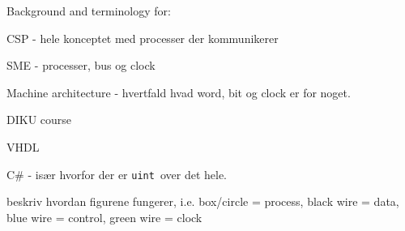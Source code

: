 Background and terminology for:

CSP - hele konceptet med processer der kommunikerer

SME - processer, bus og clock

Machine architecture - hvertfald hvad word, bit og clock er for noget.

DIKU course

VHDL

C\# - især hvorfor der er \texttt{uint} over det hele.

beskriv hvordan figurene fungerer, i.e. box/circle = process, black wire =
data, blue wire = control, green wire = clock


